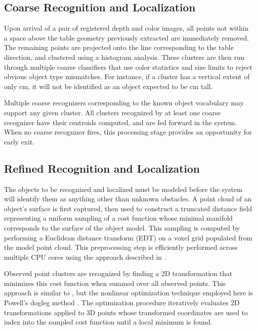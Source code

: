 \documentclass[letterpaper, 10 pt, conference]{ieeeconf}  %
\begin{document}
\subsection{Coarse Recognition and Localization}
Upon arrival of a pair of registered depth and color images, all
points not within a space above the table geometry previously
extracted are immediately removed. The remaining points are projected
onto the line corresponding to the table direction, and clustered
using a histogram analysis. These clusters are then run through
multiple coarse classifiers that use color statistics and size limits
to reject obvious object type mismatches. For instance, if a cluster
has a vertical extent of only \unit[10]{cm}, it will not be identified
as an object expected to be \unit[30]{cm} tall.

Multiple coarse recognizers corresponding to the known object
vocabulary may support any given cluster. All clusters recognized by
at least one coarse recognizer have their centroids computed, and are
fed forward in the system. When no coarse recognizer fires, this
processing stage provides an opportunity for early exit.

\subsection{Refined Recognition and Localization}
The objects to be recognized and localized must be modeled before the
system will identify them as anything other than unknown obstacles. A
point cloud of an object's surface is first captured, then used to
construct a truncated distance field representing a uniform sampling
of a cost function whose minimal manifold corresponds to the surface
of the object model. This sampling is computed by performing a
Euclidean distance transform (EDT) on a voxel grid populated from the
model point cloud. This preprocessing step is efficiently performed
across multiple CPU cores using the approach described in
\cite{Meijster2002}.

Observed point clusters are recognized by finding a 2D transformation
that minimizes this cost function when summed over all observed
points. This approach is similar to \cite{Papazov2011:Stochastic}, but
the nonlinear optimization technique employed here is Powell's dogleg
method \cite{Powell1964}. The optimization procedure iteratively
evaluates 2D transformations applied to 3D points whose transformed
coordinates are used to index into the sampled cost function until a
local minimum is found.
\end{document}
